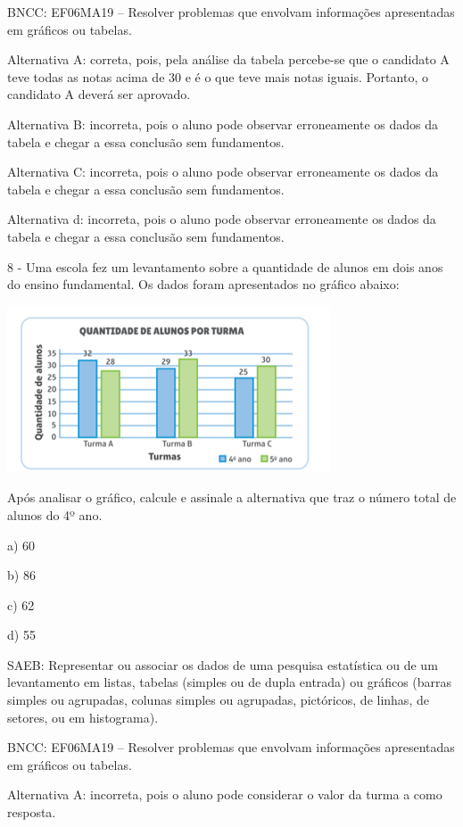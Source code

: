 BNCC: EF06MA19 -- Resolver problemas que envolvam informações
apresentadas em gráficos ou tabelas.

Alternativa A: correta, pois, pela análise da tabela percebe-se que o
candidato A teve todas as notas acima de 30 e é o que teve mais notas
iguais. Portanto, o candidato A deverá ser aprovado.

Alternativa B: incorreta, pois o aluno pode observar erroneamente os
dados da tabela e chegar a essa conclusão sem fundamentos.

Alternativa C: incorreta, pois o aluno pode observar erroneamente os
dados da tabela e chegar a essa conclusão sem fundamentos.

Alternativa d: incorreta, pois o aluno pode observar erroneamente os
dados da tabela e chegar a essa conclusão sem fundamentos.

8 - Uma escola fez um levantamento sobre a quantidade de alunos em dois
anos do ensino fundamental. Os dados foram apresentados no gráfico
abaixo:

\includegraphics[width=3.78125in,height=1.94792in]{./imgSAEB_6_MAT/media/image110.png}

Após analisar o gráfico, calcule e assinale a alternativa que traz o
número total de alunos do 4º ano.

a) 60

b) 86

c) 62

d) 55

SAEB: Representar ou associar os dados de uma pesquisa estatística ou de
um levantamento em listas, tabelas (simples ou de dupla entrada) ou
gráficos (barras simples ou agrupadas, colunas simples ou agrupadas,
pictóricos, de linhas, de setores, ou em histograma).

BNCC: EF06MA19 -- Resolver problemas que envolvam informações
apresentadas em gráficos ou tabelas.

Alternativa A: incorreta, pois o aluno pode considerar o valor da turma
a como resposta.

